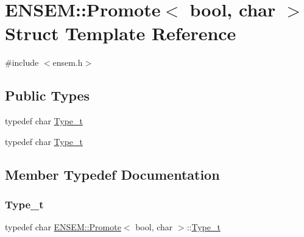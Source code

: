 \hypertarget{structENSEM_1_1Promote_3_01bool_00_01char_01_4}{}\section{E\+N\+S\+EM\+:\+:Promote$<$ bool, char $>$ Struct Template Reference}
\label{structENSEM_1_1Promote_3_01bool_00_01char_01_4}


{\ttfamily \#include $<$ensem.\+h$>$}

\subsection*{Public Types}
\begin{DoxyCompactItemize}
\item 
typedef char \mbox{\hyperlink{structENSEM_1_1Promote_3_01bool_00_01char_01_4_a77d88dbc5eb685f290b3b9bb1b2b2a67}{Type\+\_\+t}}
\item 
typedef char \mbox{\hyperlink{structENSEM_1_1Promote_3_01bool_00_01char_01_4_a77d88dbc5eb685f290b3b9bb1b2b2a67}{Type\+\_\+t}}
\end{DoxyCompactItemize}


\subsection{Member Typedef Documentation}
\mbox{\label{structENSEM_1_1Promote_3_01bool_00_01char_01_4_a77d88dbc5eb685f290b3b9bb1b2b2a67}} 
\subsubsection{\texorpdfstring{Type\_t}{Type\_t}\hspace{0.1cm}{\footnotesize\ttfamily [1/2]}}
{\footnotesize\ttfamily typedef char \mbox{\hyperlink{structENSEM_1_1Promote}{E\+N\+S\+E\+M\+::\+Promote}}$<$ bool, char $>$\+::\mbox{\hyperlink{structENSEM_1_1Promote_3_01bool_00_01char_01_4_a77d88dbc5eb685f290b3b9bb1b2b2a67}{Type\+\_\+t}}}

\mbox{\label{structENSEM_1_1Promote_3_01bool_00_01char_01_4_a77d88dbc5eb685f290b3b9bb1b2b2a67}} 
